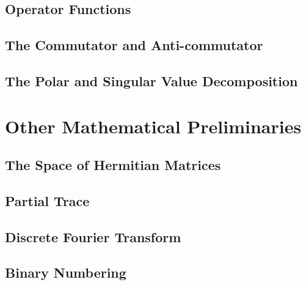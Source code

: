 \documentclass[
	11pt, %
	a4paper, %
]{LegrandOrangeBook}
\begin{document}
    \section{Operator Functions} 
    

    \section{The Commutator and Anti-commutator} 
    

    \section{The Polar and Singular Value Decomposition} 
    

\chapter{Other Mathematical Preliminaries}

    \section{The Space of Hermitian Matrices} 
    

    \section{Partial Trace} 
    

    \section{Discrete Fourier Transform} 
    

    \section{Binary Numbering} 
\end{document}
